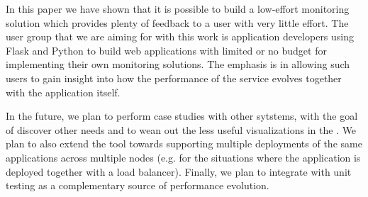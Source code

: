 \documentclass[conference]{IEEEtran}
\begin{document}
In this paper we have shown that it is possible to build a low-effort monitoring solution which provides plenty of feedback to a user with very little effort. The user group that we are aiming for with this work is application developers using Flask and Python to build web applications with limited or no budget for implementing their own monitoring solutions. The emphasis is in allowing such users to gain insight into how the performance of the service evolves together with the application itself.

In the future, we plan to perform case studies with other sytstems, with the goal of discover other needs and to wean out the less useful visualizations in the \tool. We plan to also extend the tool towards supporting multiple deployments of the same applications across multiple nodes (e.g. for the situations where the application is deployed together with a load balancer). Finally, we plan to integrate \tool with unit testing as a complementary source of performance evolution.






\end{document}
